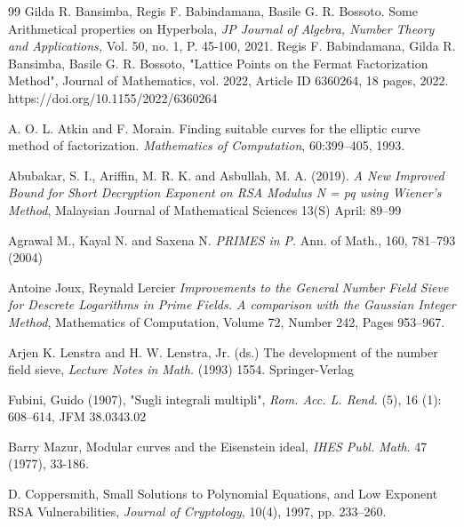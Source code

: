 \documentclass[sigconf,balance=false]{acmart}
\begin{document}

\begin{thebibliography}{99}
 Gilda R. Bansimba, Regis F. Babindamana, Basile G. R. Bossoto. Some Arithmetical properties on Hyperbola, \emph{JP Journal of Algebra, Number Theory and Applications,} Vol. 50, no. 1, P. 45-100, 2021.
 Regis F. Babindamana, Gilda R. Bansimba, Basile G. R. Bossoto, "Lattice Points on the Fermat Factorization Method", Journal of Mathematics, vol. 2022, Article ID 6360264, 18 pages, 2022. https://doi.org/10.1155/2022/6360264

 A. O. L. Atkin and F. Morain. Finding suitable curves for the elliptic curve method of factorization. \emph{Mathematics of Computation}, 60:399--405, 1993.

 Abubakar, S. I., Ariffin, M. R. K. and Asbullah, M. A. (2019). \emph{A New Improved Bound for Short Decryption Exponent on RSA Modulus N = pq using Wiener’s Method}, Malaysian Journal of Mathematical Sciences 13(S) April: 89–99 

 Agrawal M., Kayal N. and Saxena N. \emph{PRIMES in P}. Ann. of Math., 160, 781–793 (2004)

 Antoine Joux, Reynald Lercier \emph{Improvements to the General Number Field Sieve for Descrete Logarithms in Prime Fields. A comparison with the Gaussian Integer Method}, Mathematics of Computation, Volume 72, Number 242, Pages 953–967.

 Arjen K. Lenstra and H. W. Lenstra, Jr. (ds.) The development of the number field sieve,\emph{ Lecture Notes in Math.} (1993) 1554. Springer-Verlag

 Fubini, Guido (1907), "Sugli integrali multipli", \emph{Rom. Acc. L. Rend.} (5), 16 (1): 608–614, JFM 38.0343.02

 Barry Mazur, Modular curves and the Eisenstein ideal, \emph{IHES Publ. Math}. 47 (1977), 33-186.

 D. Coppersmith, Small Solutions to Polynomial Equations, and Low Exponent
RSA Vulnerabilities, \emph{Journal of Cryptology}, 10(4), 1997, pp. 233–260.


\end{thebibliography}
\end{document}
